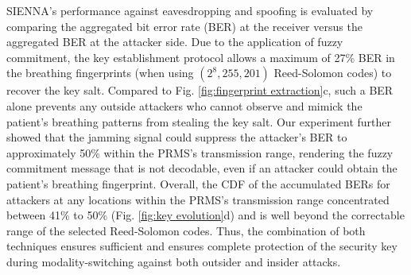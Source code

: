 
SIENNA's performance against eavesdropping and spoofing is evaluated by comparing the aggregated bit error rate (BER) at the receiver versus the aggregated BER at the attacker side. Due to the application of fuzzy commitment, the key establishment protocol allows a maximum of 27\% BER in the breathing fingerprints (when using $(2^8, 255, 201)$ Reed-Solomon codes) to recover the key salt. Compared to Fig. \ref{fig:fingerprint extraction}c, such a BER alone prevents any outside attackers who cannot observe and mimick the patient's breathing patterns from stealing the key salt. Our experiment further showed that the jamming signal could suppress the attacker's BER to approximately 50\% within the PRMS's transmission range, rendering the fuzzy commitment message that is not decodable, even if an attacker could obtain the patient's breathing fingerprint. Overall, the CDF of the accumulated BERs for attackers at any locations within the PRMS's transmission range concentrated between 41\% to 50\% (Fig. \ref{fig:key evolution}d) and is well beyond the correctable range of the selected Reed-Solomon codes. Thus, the combination of both techniques ensures sufficient and ensures complete protection of the security key during modality-switching against both outsider and insider attacks.


